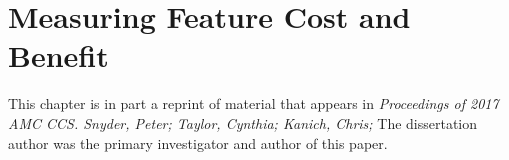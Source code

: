 \chapter{Measuring Feature Cost and Benefit}
\label{cost-benefit}

This chapter is in part a reprint of material that appears in
\textit{Proceedings of 2017 AMC CCS. Snyder, Peter; Taylor,
Cynthia; Kanich, Chris;} The dissertation author was the primary investigator and
author of this paper.






